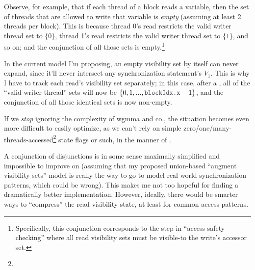 \filbreak
Observe, for example, that if each thread of a block reads a variable, then the set of threads that are allowed to write that variable is \textit{empty} (assuming at least 2 threads per block).
This is because thread 0's read restricts the valid writer thread set to $\{0\}$, thread 1's read restricts the valid writer thread set to $\{1\}$, and so on; and the conjunction of all those sets is empty.\footnote{Specifically, this conjunction corresponds to the step in ``access safety checking'' where all read visibility sets must be visible-to the write's accessor set.}

\filbreak
In the current model I'm proposing, an empty visibility set by itself can never expand, since it'll never intersect any synchronization statement's $V_1$.
This is why I have to track each read's visibility set separately; in this case, after a , all of the ``valid writer thread'' sets will now be ${\{0, 1, ..., \lighttt{blockIdx.x} - 1}\}$, and the conjunction of all those identical sets is now non-empty.

\filbreak
If we \textit{stop} ignoring the complexity of wgmma and co., the situation becomes even more difficult to easily optimize, as we can't rely on simple zero/one/many-threads-accessed\footnote{} state flags or such, in the manner of .

\filbreak
A conjunction of disjunctions is in some sense maximally simplified and impossible to improve on (assuming that my proposed union-based ``augment visibility sets'' model is really the way to go to model real-world synchronization patterns, which could be wrong).
This makes me not too hopeful for finding a dramatically better implementation.
However, ideally, there would be smarter ways to ``compress'' the read visibility state, at least for common access patterns.


\filbreak
{}

